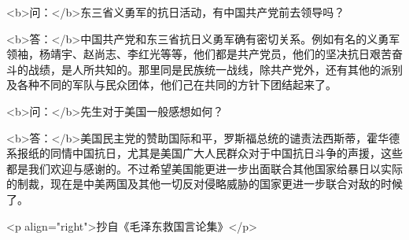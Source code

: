 <b>问：</b>东三省义勇军的抗日活动，有中国共产党前去领导吗？

<b>答：</b>中国共产党和东三省抗日义勇军确有密切关系。例如有名的义勇军领袖，杨靖宇、赵尚志、李红光等等，他们都是共产党员，他们的坚决抗日艰苦奋斗的战绩，是人所共知的。那里同是民族统一战线，除共产党外，还有其他的派别及各种不同的军队与民众团体，他们己在共同的方针下团结起来了。

<b>问：</b>先生对于美国一般感想如何？

<b>答：</b>美国民主党的赞助国际和平，罗斯福总统的谴责法西斯蒂，霍华德系报纸的同情中国抗日，尤其是美国广大人民群众对于中国抗日斗争的声援，这些都是我们欢迎与感谢的。不过希望美国能更进一步出面联合其他国家给暴日以实际的制裁，现在是中美两国及其他一切反对侵略威胁的国家更进一步联合对敌的时候了。

<p align="right">抄自《毛泽东救国言论集》</p>

